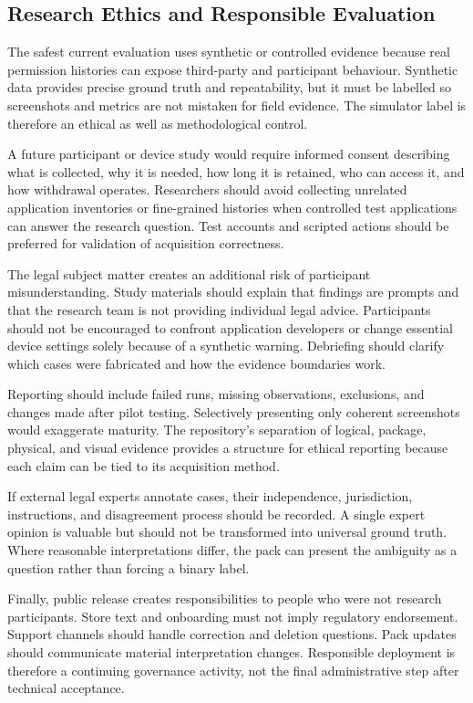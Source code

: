 \subsection{Research Ethics and Responsible Evaluation}

The safest current evaluation uses synthetic or controlled evidence because real permission histories can expose third-party and participant behaviour. Synthetic data provides precise ground truth and repeatability, but it must be labelled so screenshots and metrics are not mistaken for field evidence. The simulator label is therefore an ethical as well as methodological control.

A future participant or device study would require informed consent describing what is collected, why it is needed, how long it is retained, who can access it, and how withdrawal operates. Researchers should avoid collecting unrelated application inventories or fine-grained histories when controlled test applications can answer the research question. Test accounts and scripted actions should be preferred for validation of acquisition correctness.

The legal subject matter creates an additional risk of participant misunderstanding. Study materials should explain that findings are prompts and that the research team is not providing individual legal advice. Participants should not be encouraged to confront application developers or change essential device settings solely because of a synthetic warning. Debriefing should clarify which cases were fabricated and how the evidence boundaries work.

Reporting should include failed runs, missing observations, exclusions, and changes made after pilot testing. Selectively presenting only coherent screenshots would exaggerate maturity. The repository's separation of logical, package, physical, and visual evidence provides a structure for ethical reporting because each claim can be tied to its acquisition method.

If external legal experts annotate cases, their independence, jurisdiction, instructions, and disagreement process should be recorded. A single expert opinion is valuable but should not be transformed into universal ground truth. Where reasonable interpretations differ, the pack can present the ambiguity as a question rather than forcing a binary label.

Finally, public release creates responsibilities to people who were not research participants. Store text and onboarding must not imply regulatory endorsement. Support channels should handle correction and deletion questions. Pack updates should communicate material interpretation changes. Responsible deployment is therefore a continuing governance activity, not the final administrative step after technical acceptance.

